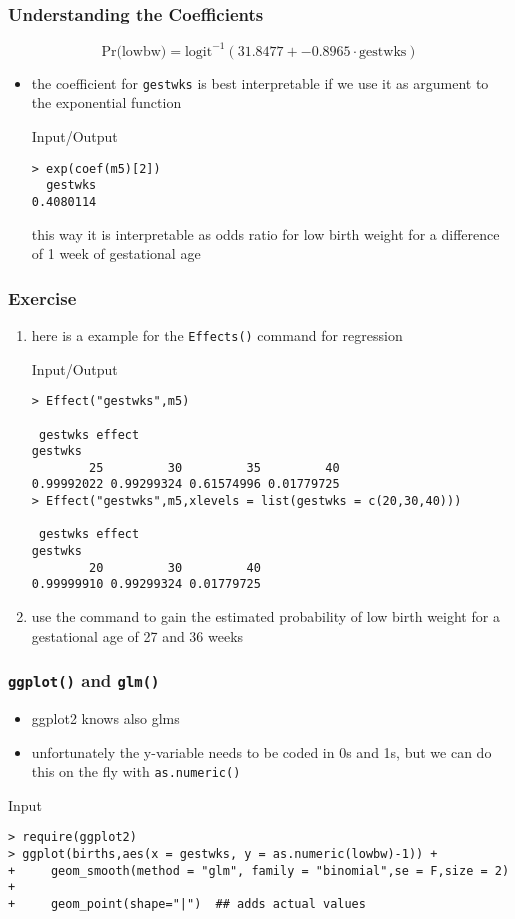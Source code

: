 \begin{frame}[fragile]\frametitle{Understanding the Coefficients}
$$\mbox{Pr(lowbw)}=\mbox{logit}^{-1}(31.8477 + -0.8965 \cdot \mbox{gestwks}) $$
\begin{itemize}
\item the coefficient for \texttt{gestwks} is best interpretable if we use it as argument to the exponential function
  \begin{exampleblock}{Input/Output}
\begin{verbatim}
> exp(coef(m5)[2])
  gestwks 
0.4080114 
\end{verbatim}
  \end{exampleblock}
this way it is interpretable as odds ratio for low birth weight for a difference of 1 week of gestational age
\end{itemize}
\end{frame}


\begin{frame}[fragile]\frametitle{Exercise}
  \begin{enumerate}
  \item here is a example for the \texttt{Effects()} command for regression
    \begin{exampleblock}{Input/Output}\scriptsize
\begin{verbatim}
> Effect("gestwks",m5)

 gestwks effect
gestwks
        25         30         35         40 
0.99992022 0.99299324 0.61574996 0.01779725 
> Effect("gestwks",m5,xlevels = list(gestwks = c(20,30,40)))

 gestwks effect
gestwks
        20         30         40 
0.99999910 0.99299324 0.01779725   
\end{verbatim}
    \end{exampleblock}\normalsize
\item use the command to gain the estimated probability of low birth weight for a gestational age of 27 and 36 weeks
  \end{enumerate}
\end{frame}


\begin{frame}[fragile]\frametitle{\texttt{ggplot()} and \texttt{glm()}}
  \begin{itemize}
  \item ggplot2 knows also glms
  \item unfortunately the y-variable needs to be coded in 0s and 1s, but we can do this on the fly with \texttt{as.numeric()}
  \end{itemize}
  \begin{exampleblock}{Input}\scriptsize
\begin{verbatim}
> require(ggplot2)
> ggplot(births,aes(x = gestwks, y = as.numeric(lowbw)-1)) +
+     geom_smooth(method = "glm", family = "binomial",se = F,size = 2) +
+     geom_point(shape="|")  ## adds actual values  
\end{verbatim}
  \end{exampleblock}
\end{frame}



